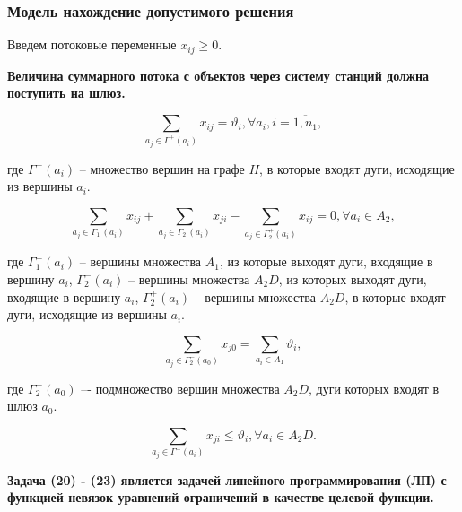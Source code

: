 \begin{frame}
    \frametitle{Модель нахождение допустимого решения }
    \fontsize{8pt}{7.2}\selectfont
    \justifying
    Введем потоковые переменные $x_{ij} \geqslant 0$.

    \textbf{Величина суммарного потока с объектов через систему станций должна поступить на шлюз.}

    \begin{equation}\label{eq:part2_1.5}
        \sum_{a_j \in \Gamma^+(a_i)} x_{ij} = \vartheta_i, \forall a_i, i =\overline{1, n_1},
    \end{equation}
    \begin{minipage}[c]{1\linewidth}
        \fontsize{6pt}{7.2}\selectfont 
        где $\Gamma^+(a_i)$ -- множество вершин на графе $H$, в которые входят дуги, исходящие из вершины $a_i$.
    \end{minipage}

    \begin{equation}\label{eq:part2_1.6}
        \sum_{a_j \in \Gamma_1^-(a_i)} x_{ij} + \sum_{a_j \in \Gamma_2^-(a_i)} x_{ji} -  \sum_{a_j \in \Gamma_2^+(a_i)} x_{ij} =0 ,\forall a_i \in A_2, 
    \end{equation}

    \begin{minipage}[c]{1\linewidth}
        \fontsize{6pt}{7.2}\selectfont 
        где $\Gamma_1^-(a_i)$ -- вершины множества $A_1$, из которые выходят дуги, входящие в вершину $a_i$, $\Gamma_2^-(a_i)$ -- вершины множества $A_2D$, из которых выходят дуги, входящие в  вершину $a_i$, $\Gamma_2^+(a_i)$ -- вершины множества $A_2D$, в которые входят дуги, исходящие из вершины  $a_i$.
    \end{minipage}
    
    \begin{equation}\label{eq:part2_1.7}
        \sum_{a_j \in \Gamma_2^-(a_0)} x_{j0} = \sum_{a_i \in A_1} \vartheta_i,
    \end{equation}
    \begin{minipage}[c]{1\linewidth}
        \fontsize{6pt}{7.2}\selectfont 
        где $\Gamma_2^-(a_0)$ –- подмножество вершин множества $A_2D$, дуги которых входят в шлюз $a_0$.
    \end{minipage}

    \begin{equation}\label{eq:part2_1.8_1}
        \sum_{a_j \in \Gamma^-(a_i)} x_{ji} \leqslant  \vartheta_i, \forall a_i \in A_2D.
    \end{equation}

    \textbf{Задача (20) - (23) является задачей линейного программирования (ЛП) с функцией невязок уравнений ограничений в качестве целевой функции.}
    

\end{frame}

